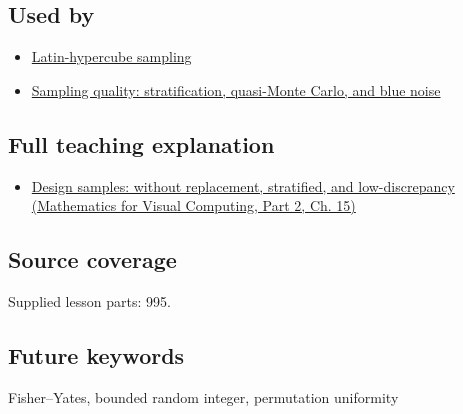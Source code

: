 \subsection{Used by}\label{appendix-184fcc411663-used-by}

\hypertarget{appendix-184fcc411663-used-by}{}

\begin{itemize}
\tightlist
\item
  \hyperref[appendix-1c5e85693a06]{Latin-hypercube sampling}
\item
  \hyperref[appendix-9f693ffd82bc]{Sampling quality: stratification, quasi-Monte Carlo, and blue noise}
\end{itemize}

\subsection{Full teaching explanation}\label{appendix-184fcc411663-full-teaching-explanation}

\hypertarget{appendix-184fcc411663-full-teaching-explanation}{}

\begin{itemize}
\tightlist
\item
  \href{../02-Mathematics-for-Visual-Computing-P02/main.pdf\#02-foundations-ii-ch031-design-samples-without-replacement-stratified-and-low-discrepancy}{Design samples: without replacement, stratified, and low-discrepancy (Mathematics for Visual Computing, Part 2, Ch. 15)}
\end{itemize}

\subsection{Source coverage}\label{appendix-184fcc411663-source-coverage}

\hypertarget{appendix-184fcc411663-source-coverage}{}

Supplied lesson parts: 995.

\subsection{Future keywords}\label{appendix-184fcc411663-future-keywords}

\hypertarget{appendix-184fcc411663-future-keywords}{}

Fisher--Yates, bounded random integer, permutation uniformity
